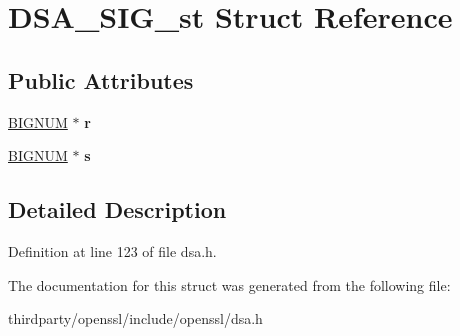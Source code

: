 \hypertarget{struct_d_s_a___s_i_g__st}{}\section{D\+S\+A\+\_\+\+S\+I\+G\+\_\+st Struct Reference}
\label{struct_d_s_a___s_i_g__st}
\subsection*{Public Attributes}
\begin{DoxyCompactItemize}
\item 
\mbox{\label{struct_d_s_a___s_i_g__st_a745899b460d408e175d9adee66ef046e}} 
\hyperlink{structbignum__st}{B\+I\+G\+N\+UM} $\ast$ {\bfseries r}
\item 
\mbox{\label{struct_d_s_a___s_i_g__st_ae7c55f852d6ca0b46b5d5c99dcfb8c2d}} 
\hyperlink{structbignum__st}{B\+I\+G\+N\+UM} $\ast$ {\bfseries s}
\end{DoxyCompactItemize}


\subsection{Detailed Description}


Definition at line 123 of file dsa.\+h.



The documentation for this struct was generated from the following file\+:\begin{DoxyCompactItemize}
\item 
thirdparty/openssl/include/openssl/dsa.\+h\end{DoxyCompactItemize}
